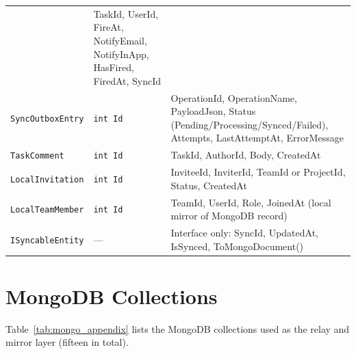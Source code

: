 \begin{table}[H]
\begin{tabular}{>{\raggedright\arraybackslash}p{3.5cm}l>{\raggedright\arraybackslash}p{8.0cm}}
  & TaskId, UserId, FireAt, NotifyEmail, NotifyInApp,
    HasFired, FiredAt, SyncId \\
\addlinespace
\texttt{SyncOutboxEntry}
  & \texttt{int Id}
  & OperationId, OperationName, PayloadJson, Status
    (Pending/Processing/Synced/Failed), Attempts, LastAttemptAt, ErrorMessage \\
\addlinespace
\texttt{TaskComment}
  & \texttt{int Id}
  & TaskId, AuthorId, Body, CreatedAt \\
\addlinespace
\texttt{LocalInvitation}
  & \texttt{int Id}
  & InviteeId, InviterId, TeamId or ProjectId, Status, CreatedAt \\
\addlinespace
\texttt{LocalTeamMember}
  & \texttt{int Id}
  & TeamId, UserId, Role, JoinedAt (local mirror of MongoDB record) \\
\addlinespace
\texttt{ISyncableEntity}
  & ---
  & Interface only: SyncId, UpdatedAt, IsSynced, ToMongoDocument() \\
\bottomrule
\end{tabular}
\end{table}

\section*{MongoDB Collections}

Table~\ref{tab:mongo_appendix} lists the MongoDB collections used as the relay
and mirror layer (fifteen in total).

